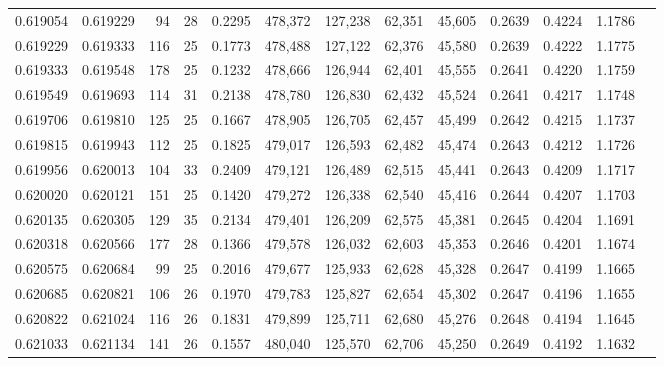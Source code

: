 \begin{tabular}{rrrrrrrrrrrrr}
0.619054 & 0.619229 &    94 &  28 &                                     0.2295 & 478,372 & 127,238 &  62,351 &  45,605 & 0.2639 & 0.4224 & 1.1786 \\
0.619229 & 0.619333 &   116 &  25 &                                     0.1773 & 478,488 & 127,122 &  62,376 &  45,580 & 0.2639 & 0.4222 & 1.1775 \\
0.619333 & 0.619548 &   178 &  25 &                                     0.1232 & 478,666 & 126,944 &  62,401 &  45,555 & 0.2641 & 0.4220 & 1.1759 \\
0.619549 & 0.619693 &   114 &  31 &                                     0.2138 & 478,780 & 126,830 &  62,432 &  45,524 & 0.2641 & 0.4217 & 1.1748 \\
0.619706 & 0.619810 &   125 &  25 &                                     0.1667 & 478,905 & 126,705 &  62,457 &  45,499 & 0.2642 & 0.4215 & 1.1737 \\
0.619815 & 0.619943 &   112 &  25 &                                     0.1825 & 479,017 & 126,593 &  62,482 &  45,474 & 0.2643 & 0.4212 & 1.1726 \\
0.619956 & 0.620013 &   104 &  33 &                                     0.2409 & 479,121 & 126,489 &  62,515 &  45,441 & 0.2643 & 0.4209 & 1.1717 \\
0.620020 & 0.620121 &   151 &  25 &                                     0.1420 & 479,272 & 126,338 &  62,540 &  45,416 & 0.2644 & 0.4207 & 1.1703 \\
0.620135 & 0.620305 &   129 &  35 &                                     0.2134 & 479,401 & 126,209 &  62,575 &  45,381 & 0.2645 & 0.4204 & 1.1691 \\
0.620318 & 0.620566 &   177 &  28 &                                     0.1366 & 479,578 & 126,032 &  62,603 &  45,353 & 0.2646 & 0.4201 & 1.1674 \\
0.620575 & 0.620684 &    99 &  25 &                                     0.2016 & 479,677 & 125,933 &  62,628 &  45,328 & 0.2647 & 0.4199 & 1.1665 \\
0.620685 & 0.620821 &   106 &  26 &                                     0.1970 & 479,783 & 125,827 &  62,654 &  45,302 & 0.2647 & 0.4196 & 1.1655 \\
0.620822 & 0.621024 &   116 &  26 &                                     0.1831 & 479,899 & 125,711 &  62,680 &  45,276 & 0.2648 & 0.4194 & 1.1645 \\
0.621033 & 0.621134 &   141 &  26 &                                     0.1557 & 480,040 & 125,570 &  62,706 &  45,250 & 0.2649 & 0.4192 & 1.1632 \\

\end{tabular}
